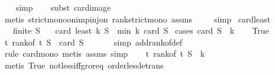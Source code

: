 \begin{isabellebody}
\ \ \isamarkupfalse%
\ simp\isanewline
\ \ \isamarkupfalse%
\ {\isacharparenleft}{\kern0pt}subst\ card{\isacharunderscore}{\kern0pt}image{\isacharparenright}{\kern0pt}\isanewline
\ \ \ \isamarkupfalse%
\ {\isacharparenleft}{\kern0pt}metis\ strict{\isacharunderscore}{\kern0pt}mono{\isacharunderscore}{\kern0pt}on{\isacharunderscore}{\kern0pt}imp{\isacharunderscore}{\kern0pt}inj{\isacharunderscore}{\kern0pt}on\ rank{\isacharunderscore}{\kern0pt}strict{\isacharunderscore}{\kern0pt}mono\ assms{\isacharparenright}{\kern0pt}\ \isanewline
\ \ \isamarkupfalse%
\ simp%
\endisatagproof
{\isafoldproof}%
%
\isadelimproof
\isanewline
%
\endisadelimproof
\isanewline
{}\isamarkupfalse%
\ card{\isacharunderscore}{\kern0pt}least{\isacharcolon}{\kern0pt}\isanewline
\ \ \ {\isachardoublequoteopen}finite\ S{\isachardoublequoteclose}\isanewline
\ \ \ {\isachardoublequoteopen}card\ {\isacharparenleft}{\kern0pt}least\ k\ S{\isacharparenright}{\kern0pt}\ {\isacharequal}{\kern0pt}\ min\ k\ {\isacharparenleft}{\kern0pt}card\ S{\isacharparenright}{\kern0pt}{\isachardoublequoteclose}\isanewline
%
\isadelimproof
%
\endisadelimproof
%
\isatagproof
{}\isamarkupfalse%
\ {\isacharparenleft}{\kern0pt}cases\ {\isachardoublequoteopen}card\ S\ {\isacharless}{\kern0pt}\ k{\isachardoublequoteclose}{\isacharparenright}{\kern0pt}\isanewline
\ \ \isamarkupfalse%
\ True\isanewline
\ \ \isamarkupfalse%
\ {\isachardoublequoteopen}{\isasymAnd}t{\isachardot}{\kern0pt}\ rank{\isacharunderscore}{\kern0pt}of\ t\ S\ {\isasymle}\ card\ S{\isachardoublequoteclose}\ \isanewline
\ \ \ \ \isamarkupfalse%
\ {\isacharparenleft}{\kern0pt}simp\ add{\isacharcolon}{\kern0pt}rank{\isacharunderscore}{\kern0pt}of{\isacharunderscore}{\kern0pt}def{\isacharparenright}{\kern0pt}\isanewline
\ \ \ \ \isamarkupfalse%
\ {\isacharparenleft}{\kern0pt}rule\ card{\isacharunderscore}{\kern0pt}mono{\isacharcomma}{\kern0pt}\ metis\ assms{\isacharcomma}{\kern0pt}\ simp{\isacharparenright}{\kern0pt}\isanewline
\ \ \isamarkupfalse%
\ {\isachardoublequoteopen}{\isasymAnd}t{\isachardot}{\kern0pt}\ rank{\isacharunderscore}{\kern0pt}of\ t\ S\ {\isacharless}{\kern0pt}\ k{\isachardoublequoteclose}\ \isanewline
\ \ \ \ \isamarkupfalse%
\ {\isacharparenleft}{\kern0pt}metis\ True\ not{\isacharunderscore}{\kern0pt}less{\isacharunderscore}{\kern0pt}iff{\isacharunderscore}{\kern0pt}gr{\isacharunderscore}{\kern0pt}or{\isacharunderscore}{\kern0pt}eq\ order{\isacharunderscore}{\kern0pt}less{\isacharunderscore}{\kern0pt}le{\isacharunderscore}{\kern0pt}trans{\isacharparenright}{\kern0pt}\isanewline

\end{isabellebody}
